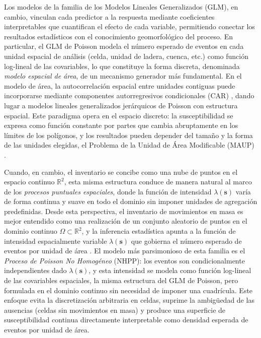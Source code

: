\documentclass[10pt, twocolumn, letterpaper]{article}
\begin{document}
Los modelos de la familia de los Modelos Lineales Generalizados (GLM), en
cambio, vinculan cada predictor a la respuesta mediante coeficientes
interpretables que cuantifican el efecto de cada variable,
permitiendo conectar los resultados estadísticos con el conocimiento
geomorfológico del proceso. En particular, el GLM de Poisson
modela el número esperado de eventos en cada unidad espacial de análisis
(celda, unidad de ladera, cuenca, etc.) como función log-lineal de las
covariables, lo que constituye la forma discreta, denominada \emph{modelo
espacial de área}, de un mecanismo generador más fundamental. En el modelo de
área, la autocorrelación espacial entre unidades contiguas puede incorporarse mediante componentes
autorregresivos condicionales (CAR) \cite{besag1974, besag1991}, dando lugar a
modelos lineales generalizados jerárquicos de Poisson con estructura espacial.
Este paradigma opera en el espacio discreto: la susceptibilidad se expresa como
función constante por partes que cambia abruptamente en los límites de los
polígonos, y los resultados pueden depender del tamaño y la forma de las
unidades elegidas, el Problema de la Unidad de Área Modificable
(MAUP) \cite{openshaw1984, fotheringham1991}.

Cuando, en cambio, el inventario se concibe como una nube de puntos en el
espacio continuo $\mathbb{R}^2$, esta misma estructura conduce de manera
natural al marco de los \emph{procesos puntuales espaciales}, donde la función
de intensidad $\lambda(\mathbf{s})$ varía de forma continua y suave en todo el
dominio sin imponer unidades de agregación predefinidas. Desde esta perspectiva,
el inventario de movimientos en masa es mejor entendido como una realización de
un conjunto aleatorio de puntos en el dominio continuo
$\Omega \subset \mathbb{R}^2$, y la inferencia estadística apunta a la función
de intensidad espacialmente variable $\lambda(\mathbf{s})$ que gobierna el
número esperado de eventos por unidad de área \cite{diggle2013}. El modelo más
parsimonioso de esta familia es el \emph{Proceso de Poisson No Homogéneo}
(NHPP): los eventos son condicionalmente independientes dado
$\lambda(\mathbf{s})$, y esta intensidad se modela como función log-lineal de
las covariables espaciales, la misma estructura del GLM de Poisson, pero
formulada en el dominio continuo sin necesidad de imponer una cuadrícula. Este
enfoque evita la discretización arbitraria en celdas, suprime la ambigüedad de
las ausencias (celdas sin movimientos en masa) y produce una superficie de
susceptibilidad continua directamente interpretable como densidad esperada de
eventos por unidad de área.
\end{document}
